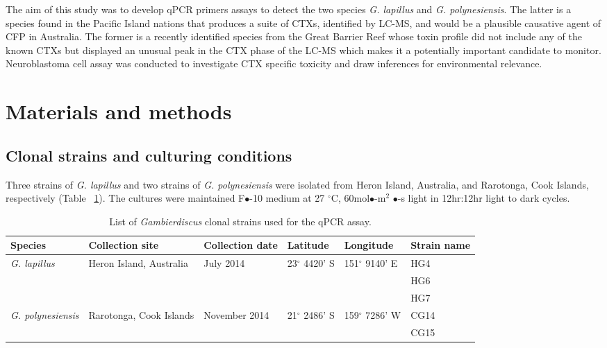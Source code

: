 \documentclass[12pt]{article}
\begin{document}
The aim of this study was to develop qPCR primers assays to detect the two species \emph{G. lapillus} and \emph{G. polynesiensis}. The latter is a species found in the Pacific Island nations that produces a suite of CTXs, identified by LC-MS, and would be a plausible causative agent of CFP in Australia. The former is a recently identified species from the Great Barrier Reef whose toxin profile did not include any of the known CTXs but displayed an unusual peak in the CTX phase of the LC-MS which makes it a potentially important candidate to monitor. Neuroblastoma cell assay was conducted to investigate CTX specific toxicity and draw inferences for environmental relevance.
\newpage
\section{Materials and methods}
\subsection{Clonal strains and culturing conditions}
Three strains of \emph{G. lapillus} and two strains of \emph{G. polynesiensis} were isolated from Heron Island, Australia, and Rarotonga, Cook Islands, respectively (Table ~\ref{tbl:StrainTable}). The cultures were maintained F$\bullet$-10 medium at 27 $^{\circ}$C, 60mol$\bullet$-m$^{2}$ $\bullet$-s light in 12hr:12hr light to dark cycles.
\FloatBarrier
\begin{table}
\caption{List of \emph{Gambierdiscus} clonal strains used for the qPCR assay.}
\label{tbl:StrainTable}
\begin{tabular}{ | p{2cm} | p{2cm} | p{2cm}| p{3cm} | p{3cm} | p{2cm} | }
\hline
\textbf{Species} & \textbf{Collection site} & \textbf{Collection date} &\textbf{Latitude} & \textbf{Longitude} & \textbf{Strain name} \\
\hline
\emph{G. lapillus} &Heron Island, Australia &July 2014 &23$^{\circ}$ 4420' S&151$^{\circ}$ 9140' E & HG4 \\
\hline
&&&&& HG6\\
\hline
&&&& &HG7\\
\hline
\emph{G. polynesiensis}&Rarotonga, Cook Islands&November 2014 &21$^{\circ}$ 2486' S&159$^{\circ}$ 7286' W & CG14 \\
\hline
&&&&&CG15\\
\hline
\end{tabular}
\end{table}
\end{document}
